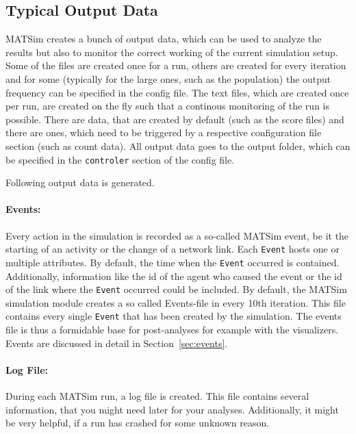 \subsection{Typical Output Data}
\label{sec:outputdata}
MATSim creates a bunch of output data, which can be used to analyze the results but also to monitor the correct working of the current simulation setup. Some of the files are created once for a run, others are created for every iteration and for some (typically for the large ones, such as the population) the output frequency can be specified in the config file. The text files, which are created once per run, are created on the fly such that a continous monitoring of the run is possible. There are data, that are created by default (such as the score files) and there are ones, which need to be triggered by a respective configuration file section (such as count data). All output data goes to the output folder, which can be specified in the \lstinline|controler| section of the config file.

Following output data is generated.

\paragraph{Events:} Every action in the simulation is recorded as a so-called MATSim event, be it the starting of an activity or the change of a network link. Each \lstinline|Event| hosts one or multiple attributes. By default, the time when the \lstinline|Event| occurred is contained. Additionally, information like the id of the agent who caused the event or the id of the link where the \lstinline|Event| occurred could be included.  By default, the MATSim simulation module creates a so called Events-file in every 10th iteration. This file contains every single \lstinline|Event| that has been created by the simulation. The events file is thus a formidable base for post-analyses for example with the visualizers. Events are discussed in detail in Section~\ref{sec:events}.

\paragraph{Log File:}
During each MATSim run, a log file is created. This file contains several information, that you might need later for your analyses. Additionally, it might be very helpful, if a run has crashed for some unknown reason. 

